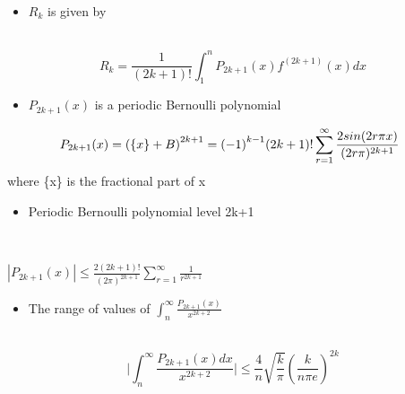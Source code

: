 \documentclass{article}
\begin{document}
\begin{multicols}{3}
		\noindent
		\begin{minipage}[t]{.96\linewidth}
			\vspace{.3cm}
			\begin{itemize}
				\Large \item$R_k$ is given by
			\end{itemize} \\
			\begin{equation*}
				R_k = \frac{1}{(2k+1)!} \int_{1}^{n} P_{2k+1} (x) f^{(2k+1)} (x)dx
			\end{equation*}
		\end{minipage}
		\begin{minipage}[t]{.96\linewidth}
			\vspace{.3cm}
			\begin{itemize}
				\Large \item $P_{2k+1} (x)$ is a periodic Bernoulli polynomial 
			\end{itemize}
			\begin{equation*}
                \hspace{-0.2cm}
				P_{2k+1}(x)={(\{x\}+B)}^{2k+1}={(-1)}^{k-1}(2k+1)!\sum_{r=1}^\infty \frac{2sin(2r{\pi}x)}{(2r{\pi})^{2k+1}}
			\end{equation*}
			\Large where \{x\} is the fractional part of x
		\end{minipage}
		
		\noindent
		\begin{minipage}[t]{.96\linewidth}
			\vspace{.3cm}
			\begin{itemize}
				\Large\item Periodic Bernoulli polynomial level 2k+1
			\end{itemize} \\
			
			\begin{center}
    		   $|P_{2k+1} (x)| \leq \frac{2(2k+1)!}{(2\pi)^{2k+1}}\sum_{r=1}^{\infty}\frac{1}{r^{2k+1}}$
			\end{center}
			
		\end{minipage}
		
		\noindent
		\begin{minipage}[t]{.96\linewidth}
			\vspace{.3cm}
			\begin{itemize}
				\Large\item The range of values of $\int_n^\infty \frac{P_{2k+1} (x)}{x^{2k+2}}$
			\end{itemize} \\
			\begin{equation*}
				\bigg|\int_n^\infty \frac{P_{2k+1} (x)dx}{x^{2k+2}}\bigg| \leq \frac{4}{n}\sqrt{\frac{k}{\pi}}(\frac{k}{n\pi{e}})^{2k}
			\end{equation*}
		\end{minipage}
		

\end{multicols}
\end{document}
